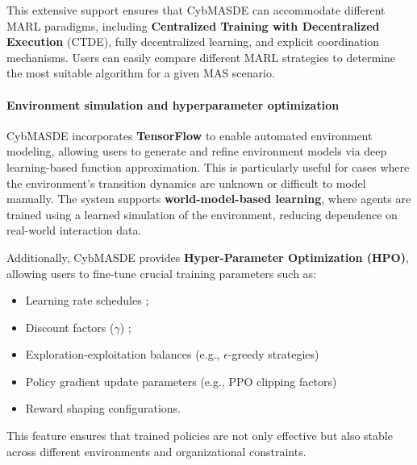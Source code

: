 \documentclass[pdflatex,sn-mathphys-num]{sn-jnl}%
\theoremstyle{thmstyleone}%
\theoremstyle{thmstyletwo}%
\theoremstyle{thmstylethree}%
\begin{document}
This extensive support ensures that CybMASDE can accommodate different MARL paradigms, including \textbf{Centralized Training with Decentralized Execution} (CTDE), fully decentralized learning, and explicit coordination mechanisms. Users can easily compare different MARL strategies to determine the most suitable algorithm for a given MAS scenario.

\paragraph{Environment simulation and hyperparameter optimization}
CybMASDE incorporates \textbf{TensorFlow} to enable automated environment modeling, allowing users to generate and refine environment models via deep learning-based function approximation. This is particularly useful for cases where the environment's transition dynamics are unknown or difficult to model manually. The system supports \textbf{world-model-based learning}, where agents are trained using a learned simulation of the environment, reducing dependence on real-world interaction data.

Additionally, CybMASDE provides \textbf{Hyper-Parameter Optimization (HPO)}, allowing users to fine-tune crucial training parameters such as:
\begin{itemize}
    \item Learning rate schedules ;
    \item Discount factors ($\gamma$) ; %
    \item Exploration-exploitation balances (e.g., $\epsilon$-greedy strategies)
    \item Policy gradient update parameters (e.g., PPO clipping factors)
    \item Reward shaping configurations.
\end{itemize}

This feature ensures that trained policies are not only effective but also stable across different environments and organizational constraints.
\end{document}
